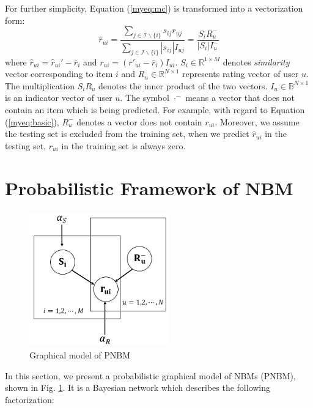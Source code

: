 \documentclass[conference]{IEEEtran}
\begin{document}

For further simplicity,
Equation (\ref{myeq:mc}) is transformed into a vectorization form:
\begin{equation}\label{myeq:basic}
\hat{r}_{ui} = \frac{\sum_{j\in \mathcal{I} \backslash \{i\}}s_{ij}r_{uj}}{\sum_{j \in \mathcal{I} \backslash \{i\}}|s_{ij}|I_{uj}}=\frac{S_iR_u^{-}}{|S_i|I_u^{-}}
\end{equation}
where $\hat{r}_{ui} = \hat{r}_{ui}'-\bar{r}_{i}$ and $r_{ui}=(r'_{ui}-\bar{r}_i)I_{ui}$.  $S_{i} \in \mathbb{R}^{1\times M}$ denotes \emph{similarity} vector corresponding to item $i$ and  $R_{u} \in \mathbb{R}^{N\times 1}$ represents rating vector of user $u$. The multiplication $S_{i}R_{u}$ denotes the inner product of the two vectors. $I_{u} \in \mathbb{B}^{N\times 1}$ is an indicator vector of user $u$. The symbol $\cdot ^-$ means a vector that does not contain an item which is being predicted. For example, with regard to Equation (\ref{myeq:basic}), $R_{u}^-$ denotes a vector does not contain $r_{ui}$.  Moreover, we assume the testing set is excluded from the training set, when we predict $\hat{r}_{ui}$ in the testing set, $r_{ui}$ in the training set is always zero.

\section{Probabilistic Framework of NBM}
\label{asimple}

\begin{figure}[ht!]
\centering
\includegraphics[height=2.3in, width=2.4in]{graph-pnbm}
\caption{Graphical model of PNBM}
\label{gpnbm}
\end{figure}

In this section, we present a probabilistic graphical model of NBMs (PNBM), shown in Fig. \ref{gpnbm}. It is a Bayesian network which describes the following factorization:
\end{document}
